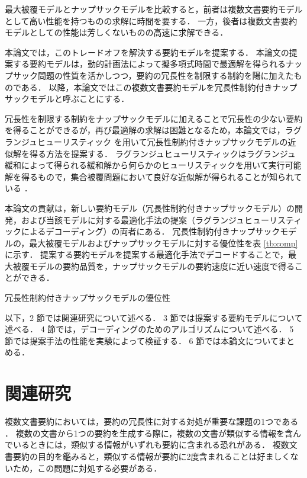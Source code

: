 \documentclass[japanese]{jnlp_1.4}
\begin{document}
最大被覆モデルとナップサックモデルを比較すると，前者は複数文書要約モデルとして高い性能を持つものの求解に時間を要する．
一方，後者は複数文書要約モデルとしての性能は芳しくないものの高速に求解できる．

本論文では，このトレードオフを解決する要約モデルを提案する．
本論文の提案する要約モデルは，動的計画法によって擬多項式時間で最適解を得られるナップサック問題の性質を活かしつつ，要約の冗長性を制限する制約を陽に加えたものである．
以降，本論文ではこの複数文書要約モデルを冗長性制約付きナップサックモデルと呼ぶことにする．

冗長性を制限する制約をナップサックモデルに加えることで冗長性の少ない要約を得ることができるが，再び最適解の求解は困難となるため，本論文では，ラグランジュヒューリスティック \cite{haddadi97,umetani07} を用いて冗長性制約付きナップサックモデルの近似解を得る方法を提案する．
ラグランジュヒューリスティックはラグランジュ緩和によって得られる緩和解から何らかのヒューリスティックを用いて実行可能解を得るもので，集合被覆問題において良好な近似解が得られることが知られている \cite{umetani07}．

本論文の貢献は，新しい要約モデル（冗長性制約付きナップサックモデル）の開発，および当該モデルに対する最適化手法の提案（ラグランジュヒューリスティックによるデコーディング）の両者にある．
冗長性制約付きナップサックモデルの，最大被覆モデルおよびナップサックモデルに対する優位性を表 \ref{tb:comp} に示す．
提案する要約モデルを提案する最適化手法でデコードすることで，最大被覆モデルの要約品質を，ナップサックモデルの要約速度に近い速度で得ることができる．

\begin{table}[t]
\caption{冗長性制約付きナップサックモデルの優位性}
\label{tb:comp}

\end{table}

以下，2 節では関連研究について述べる．
3 節では提案する要約モデルについて述べる．
4 節では，デコーディングのためのアルゴリズムについて述べる．
5 節では提案手法の性能を実験によって検証する．
6 節では本論文についてまとめる．



\section{関連研究}
\label{relatedwork}

複数文書要約においては，要約の冗長性に対する対処が重要な課題の1つである \cite{okumura05}．
複数の文書から1つの要約を生成する際に，複数の文書が類似する情報を含んでいるときには，類似する情報がいずれも要約に含まれる恐れがある．
複数文書要約の目的を鑑みると，類似する情報が要約に2度含まれることは好ましくないため，この問題に対処する必要がある．
\end{document}

